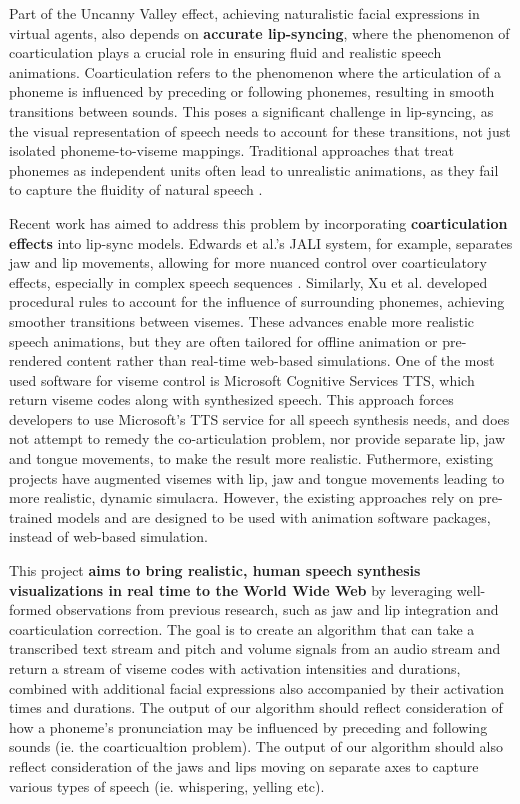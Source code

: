 \documentclass[12pt]{article}
\begin{document}
Part of the Uncanny Valley effect, achieving naturalistic facial expressions in virtual agents, also depends on {\bf accurate lip-syncing}, where the phenomenon of coarticulation plays a crucial role in ensuring fluid and realistic speech animations. Coarticulation refers to the phenomenon where the articulation of a phoneme is influenced by preceding or following phonemes, resulting in smooth transitions between sounds. This poses a significant challenge in lip-syncing, as the visual representation of speech needs to account for these transitions, not just isolated phoneme-to-viseme mappings. Traditional approaches that treat phonemes as independent units often lead to unrealistic animations, as they fail to capture the fluidity of natural speech \cite{Edwards2016}.

Recent work has aimed to address this problem by incorporating {\bf coarticulation effects} into lip-sync models. Edwards et al.’s JALI system, for example, separates jaw and lip movements, allowing for more nuanced control over coarticulatory effects, especially in complex speech sequences \cite{Edwards2016}. Similarly, Xu et al. \cite{Xu2013AGames} developed procedural rules to account for the influence of surrounding phonemes, achieving smoother transitions between visemes. These advances enable more realistic speech animations, but they are often tailored for offline animation or pre-rendered content rather than real-time web-based simulations.
One of the most used software for viseme control is Microsoft Cognitive Services TTS, which return viseme codes along with synthesized speech. This approach forces developers to use Microsoft's TTS service for all speech synthesis needs, and does not attempt to remedy the co-articulation problem, nor provide separate lip, jaw and tongue movements, to make the result more realistic.  Futhermore, existing projects have augmented visemes with lip, jaw and tongue movements leading to  more realistic, dynamic simulacra. However, the existing approaches rely on pre-trained models and are designed to be used with animation software packages, instead of web-based simulation.  

 This project {\bf aims to bring realistic, human speech synthesis visualizations in real time to the World Wide Web} by leveraging well-formed observations from previous research, such as jaw and lip integration and coarticulation correction.
The goal is to create an algorithm that can take a transcribed text stream and pitch and volume signals from an audio stream and return a stream of viseme codes with activation intensities and durations, combined with additional facial expressions also accompanied by their activation times and durations.  The  output of our algorithm should reflect consideration of how a phoneme's pronunciation may be influenced by preceding and following sounds (ie. the coarticualtion problem). The output of our algorithm should also reflect consideration of the jaws and lips moving on separate axes to capture various types of speech (ie. whispering, yelling etc). 
\end{document}
